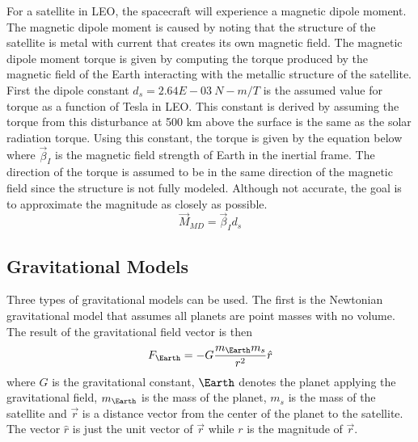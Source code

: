 \documentclass{article}
\begin{document}
For a satellite in LEO, the spacecraft will experience a magnetic
dipole moment. The magnetic dipole moment is caused by noting that the
structure of the satellite is metal with current that creates its own
magnetic field. The magnetic dipole moment torque is given by
computing the torque produced by the magnetic field of the Earth
interacting with the metallic structure of the satellite. First the
dipole constant $d_s=2.64E-03~N-m/T$ is the assumed value for torque
as a function of Tesla in LEO. This constant is derived by assuming
the torque from this disturbance at 500 km above the surface is the
same as the solar radiation torque. Using this constant, the torque is
given by the equation below where $\vec{\beta}_I$ is the magnetic
field strength of Earth in the inertial frame. The direction of the
torque is assumed to be in the same direction of the magnetic field
since the structure is not fully modeled. Although not accurate, the
goal is to approximate the magnitude as closely as possible.  
\begin{equation}
    \vec{M}_{MD}=\vec{\beta}_I d_s
\end{equation}

\subsection{Gravitational Models}

Three types of gravitational models can be used. The first is the
Newtonian gravitational model that assumes all planets are point
masses with no volume. The result of the gravitational field vector is
then
\begin{equation}
  F_{\Earth} = -G\frac{m_{\Earth} m_s}{r^2}\hat{r}
\end{equation}
where $G$ is the gravitational constant, $\Earth$ denotes the planet
applying the gravitational field, $m_\Earth$ is the mass of the
planet, $m_s$ is the mass of the satellite and $\vec{r}$ is a distance
vector from the center of the planet to the satellite. The vector
$\hat{r}$ is just the unit vector of $\vec{r}$ while $r$ is the
magnitude of $\vec{r}$.
\end{document}
